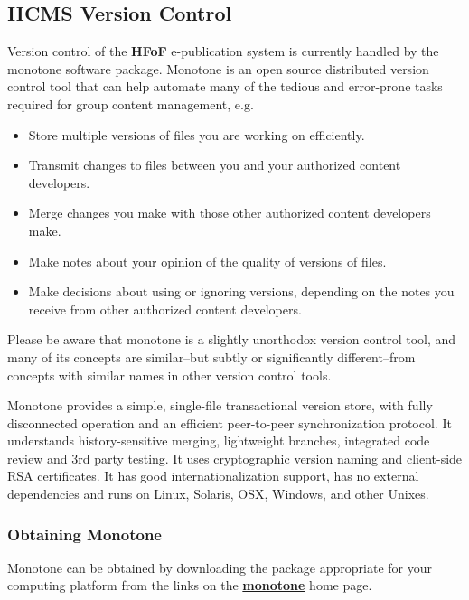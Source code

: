 \documentclass[12pt]{article}
\begin{document}
\subsection{HCMS Version Control}

Version control of the {\bf \small HFoF} e-publication system is currently handled by the monotone software package. Monotone is an open source distributed version control tool that can help automate many of the tedious and error-prone tasks required for group content management, e.g.
\begin{itemize}[noitemsep,nolistsep]
\item Store multiple versions of files you are working on efficiently.
\item Transmit changes to files between you and your authorized content developers.
\item Merge changes you make with those other authorized content developers make.
\item Make notes about your opinion of the quality of versions of files.
\item Make decisions about using or ignoring versions, depending on the notes you receive from other authorized content developers. 
\end{itemize}
Please be aware that monotone is a slightly unorthodox version control tool, and many of its concepts are similar--but subtly or significantly different--from concepts with similar names in other version control tools. 

Monotone provides a simple, single-file transactional version store, with fully disconnected operation and an efficient peer-to-peer synchronization protocol. It understands history-sensitive merging, lightweight branches, integrated code review and 3rd party testing. It uses cryptographic version naming and client-side RSA certificates. It has good internationalization support, has no external dependencies and runs on Linux, Solaris, OSX, Windows, and other Unixes.

\subsubsection{Obtaining Monotone}
Monotone can be obtained by downloading the package appropriate for your computing platform from the links on the \href{http://monotone.ca/}{\bf monotone} home page.
\end{document}
